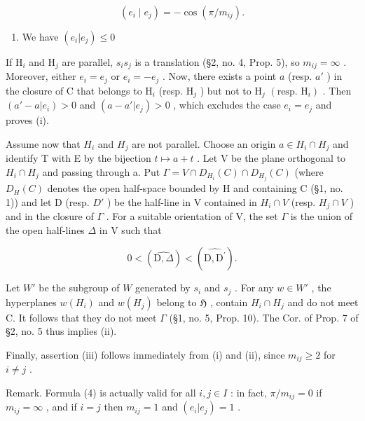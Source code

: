 \[
\left(e _ {i} \mid e _ {j}\right) = - \cos (\pi / m _ {i j}).\tag{4}
\]

\begin{enumerate}
\def\labelenumi{(\roman{enumi})}
\setcounter{enumi}{2}
\tightlist
\item
  We have \((e_i|e_j)\leqslant 0\)
\end{enumerate}

If \(\mathrm{H}_i\) and \(\mathrm{H}_j\) are parallel, \(s_i s_j\) is a translation (§2, no. 4, Prop. 5), so \(m_{ij} = \infty\) . Moreover, either \(e_i = e_j\) or \(e_i = -e_j\) . Now, there exists a point \(a\) (resp. \(a'\) ) in the closure of C that belongs to \(\mathrm{H}_i\) (resp. \(\mathrm{H}_j\) ) but not to \(\mathrm{H}_j\) \((\text{resp. } \mathrm{H}_i)\) . Then \((a' - a|e_i) > 0\) and \((a - a'|e_j) > 0\) , which excludes the case \(e_i = e_j\) and proves (i).

Assume now that \(H_{i}\) and \(H_{j}\) are not parallel. Choose an origin \(a \in H_{i} \cap H_{j}\) and identify T with E by the bijection \(t \mapsto a + t\) . Let V be the plane orthogonal to \(H_{i} \cap H_{j}\) and passing through a. Put \(\Gamma = V \cap D_{H_{i}}(C) \cap D_{H_{j}}(C)\) (where \(D_{H}(C)\) denotes the open half-space bounded by H and containing C (§1, no. 1)) and let D (resp. \(D'\) ) be the half-line in V contained in \(H_{i} \cap V\) (resp. \(H_{j} \cap V\) ) and in the closure of \(\Gamma\) . For a suitable orientation of V, the set \(\Gamma\) is the union of the open half-lines \(\Delta\) in V such that

\[
0 <   (\widehat {\mathrm{D} , \Delta}) <   (\widehat {\mathrm{D} , \mathrm{D} ^ {\prime}}).
\]

Let \(W'\) be the subgroup of \(W\) generated by \(s_i\) and \(s_j\) . For any \(w \in W'\) , the hyperplanes \(w(H_i)\) and \(w(H_j)\) belong to \(\mathfrak{H}\) , contain \(H_i \cap H_j\) and do not meet C. It follows that they do not meet \(\Gamma\) (§1, no. 5, Prop. 10). The Cor. of Prop. 7 of §2, no. 5 thus implies (ii).

Finally, assertion (iii) follows immediately from (i) and (ii), since \(m_{ij} \geqslant 2\) for \(i \neq j\) .

Remark. Formula (4) is actually valid for all \(i, j \in I\) : in fact, \(\pi / m_{ij} = 0\) if \(m_{ij} = \infty\) , and if \(i = j\) then \(m_{ij} = 1\) and \((e_i | e_j) = 1\) .

